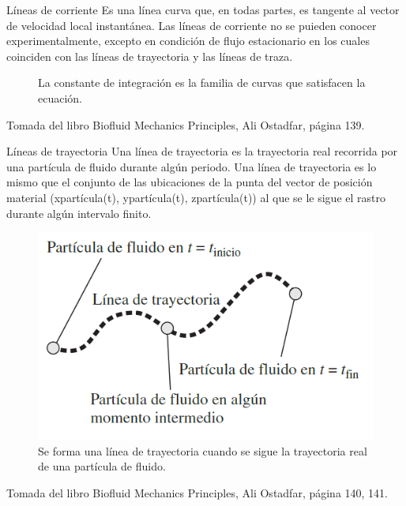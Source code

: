 \begin{frame}{Líneas de corriente}
\justifying
Es una línea curva que, en todas partes, es tangente al vector de velocidad local instantánea.
Las líneas de corriente no se puieden conocer experimentalmente, excepto en condición de flujo estacionario en los cuales coinciden con las líneas de trayectoria y las líneas de traza.
\begin{figure}
\centering
{}
\caption{La constante de integración es la familia de curvas que satisfacen la ecuación.}
\label{f:casoeuleriano}
\end{figure}	
{\tiny Tomada del libro Biofluid Mechanics Principles, Ali Ostadfar, página 139.}
\end{frame}	

\begin{frame}{Líneas de trayectoria}
\justifying
Una línea de trayectoria es la trayectoria real recorrida por una partícula de fluido durante algún periodo.
Una línea de trayectoria es lo mismo que el conjunto de las ubicaciones de la punta del vector de posición material (xpartícula(t), ypartícula(t), zpartícula(t)) al que se le sigue el rastro durante algún intervalo finito.
\begin{figure}[H]
\centering
\includegraphics[scale=0.3]{Section_Files/picmanuel/10.png}
\caption{Se forma una línea de trayectoria cuando se sigue la trayectoria real de una partícula de fluido.}
\label{fig: Figura2-Fig0403-05}
\end{figure}	
{\tiny Tomada del libro Biofluid Mechanics Principles, Ali Ostadfar, página 140, 141.}
\end{frame}

